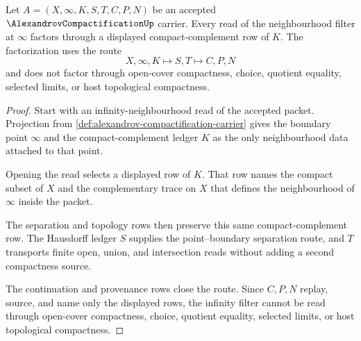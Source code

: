 \begin{theorem}
\label{thm:alexandrov-compactification-neighborhood-filter-boundary}
Let $A=(X,\infty,K,S,T,C,P,N)$ be an accepted $\AlexandrovCompactificationUp$ carrier. Every read of the neighbourhood filter at $\infty$ factors through a displayed compact-complement row of $K$. The factorization uses the route
$$
X,\infty,K \longmapsto S,T \longmapsto C,P,N
$$
and does not factor through open-cover compactness, choice, quotient equality, selected limits, or host topological compactness.
\end{theorem}
\begin{proof}
Start with an infinity-neighbourhood read of the accepted packet. Projection from \autoref{def:alexandrov-compactification-carrier} gives the boundary point $\infty$ and the compact-complement ledger $K$ as the only neighbourhood data attached to that point.

Opening the read selects a displayed row of $K$. That row names the compact subset of $X$ and the complementary trace on $X$ that defines the neighbourhood of $\infty$ inside the packet.

The separation and topology rows then preserve this same compact-complement row. The Hausdorff ledger $S$ supplies the point--boundary separation route, and $T$ transports finite open, union, and intersection reads without adding a second compactness source.

The continuation and provenance rows close the route. Since $C,P,N$ replay, source, and name only the displayed rows, the infinity filter cannot be read through open-cover compactness, choice, quotient equality, selected limits, or host topological compactness.
\end{proof}


\begin{closurestatus}{\AlexandrovCompactificationUp}
  \theoryclosure{\seedClosure}
  \formalstatus{\unformalizedV}
\end{closurestatus}
